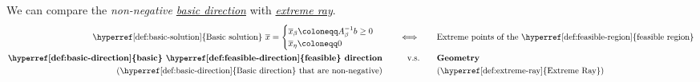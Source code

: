\begin{remark}
	We can compare the \emph{non-negative \hyperref[def:basic-direction]{basic direction}} with \emph{\hyperref[def:extreme-ray]{extreme ray}}.
	\[
		\begin{alignedat}{4}
			\text{\hyperref[def:basic-solution]{Basic solution} }\overline{x}=\begin{cases}
				\overline{x}_{\beta}\coloneqq A^{-1}_{\beta}b\geq 0 \\
				\overline{x}_{\eta} \coloneqq 0
			\end{cases} &&\qquad\iff\qquad&\text{Extreme points of the \hyperref[def:feasible-region]{feasible region}}\\
			\text{\textbf{\hyperref[def:basic-direction]{basic} \hyperref[def:feasible-direction]{feasible} direction}} && \qquad \text{v.s.}\qquad&\text{\textbf{Geometry}}\\
			\text{(\hyperref[def:basic-direction]{Basic direction} that are non-negative)}&& &\text{(\hyperref[def:extreme-ray]{Extreme Ray})}
		\end{alignedat}
	\]
\end{remark}